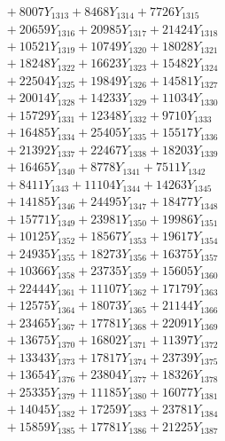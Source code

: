 \documentclass[a4paper,10pt]{article}
\begin{document}
{\begin{align}
&\;  + 8007 Y_{1313} + 8468 Y_{1314} + 7726 Y_{1315} \\[0.3ex]
&\;  + 20659 Y_{1316} + 20985 Y_{1317} + 21424 Y_{1318} \\[0.5ex]\allowbreak
&\;  + 10521 Y_{1319} + 10749 Y_{1320} + 18028 Y_{1321} \\[0.3ex]
&\;  + 18248 Y_{1322} + 16623 Y_{1323} + 15482 Y_{1324} \\[0.3ex]
&\;  + 22504 Y_{1325} + 19849 Y_{1326} + 14581 Y_{1327} \\[0.3ex]
&\;  + 20014 Y_{1328} + 14233 Y_{1329} + 11034 Y_{1330} \\[0.3ex]
&\;  + 15729 Y_{1331} + 12348 Y_{1332} + 9710 Y_{1333} \\[0.3ex]
&\;  + 16485 Y_{1334} + 25405 Y_{1335} + 15517 Y_{1336} \\[0.3ex]
&\;  + 21392 Y_{1337} + 22467 Y_{1338} + 18203 Y_{1339} \\[0.3ex]
&\;  + 16465 Y_{1340} + 8778 Y_{1341} + 7511 Y_{1342} \\[0.3ex]
&\;  + 8411 Y_{1343} + 11104 Y_{1344} + 14263 Y_{1345} \\[0.3ex]
&\;  + 14185 Y_{1346} + 24495 Y_{1347} + 18477 Y_{1348} \\[0.5ex]\allowbreak
&\;  + 15771 Y_{1349} + 23981 Y_{1350} + 19986 Y_{1351} \\[0.3ex]
&\;  + 10125 Y_{1352} + 18567 Y_{1353} + 19617 Y_{1354} \\[0.3ex]
&\;  + 24935 Y_{1355} + 18273 Y_{1356} + 16375 Y_{1357} \\[0.3ex]
&\;  + 10366 Y_{1358} + 23735 Y_{1359} + 15605 Y_{1360} \\[0.3ex]
&\;  + 22444 Y_{1361} + 11107 Y_{1362} + 17179 Y_{1363} \\[0.3ex]
&\;  + 12575 Y_{1364} + 18073 Y_{1365} + 21144 Y_{1366} \\[0.3ex]
&\;  + 23465 Y_{1367} + 17781 Y_{1368} + 22091 Y_{1369} \\[0.3ex]
&\;  + 13675 Y_{1370} + 16802 Y_{1371} + 11397 Y_{1372} \\[0.3ex]
&\;  + 13343 Y_{1373} + 17817 Y_{1374} + 23739 Y_{1375} \\[0.3ex]
&\;  + 13654 Y_{1376} + 23804 Y_{1377} + 18326 Y_{1378} \\[0.5ex]\allowbreak
&\;  + 25335 Y_{1379} + 11185 Y_{1380} + 16077 Y_{1381} \\[0.3ex]
&\;  + 14045 Y_{1382} + 17259 Y_{1383} + 23781 Y_{1384} \\[0.3ex]
&\;  + 15859 Y_{1385} + 17781 Y_{1386} + 21225 Y_{1387} \\[0.3ex]

\end{align}}
\end{document}
